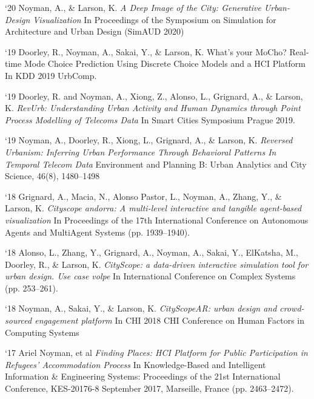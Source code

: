 \begin{tablist}
    \item[`20] \tab  Noyman, A., \& Larson, K.
    \textit{A Deep Image of the City: Generative Urban-Design Visualization
    }
    In Proceedings of the Symposium on Simulation for Architecture and Urban Design (SimAUD 2020)


    \item[`19] \tab  Doorley, R., Noyman, A., Sakai, Y., \& Larson, K.
    What’s your MoCho? Real-time Mode Choice Prediction Using Discrete Choice Models and a HCI Platform
    In KDD 2019 UrbComp.

    \item[`19] \tab  Doorley, R. and Noyman, A., Xiong, Z., Alonso, L., Grignard, A., \& Larson, K.
    \textit{RevUrb: Understanding Urban Activity and Human Dynamics through Point Process Modelling of Telecoms Data}
    In Smart Cities Symposium Prague 2019.

    \item[`19] \tab  Noyman, A., Doorley, R., Xiong, L., Grignard, A., \& Larson, K.
    \textit{Reversed Urbanism: Inferring Urban Performance Through Behavioral Patterns In Temporal Telecom Data}
    Environment and Planning B: Urban Analytics and City Science, 46(8), 1480–1498

    \item[`18] \tab  Grignard, A., Macia, N., Alonso Pastor, L., Noyman, A., Zhang, Y., \& Larson, K.
    \textit{Cityscope andorra: A multi-level interactive and tangible agent-based visualization}
    In Proceedings of the 17th International Conference on Autonomous Agents and MultiAgent Systems (pp. 1939–1940).

    \item[`18] \tab  Alonso, L., Zhang, Y., Grignard, A., Noyman, A., Sakai, Y., ElKatsha, M., Doorley, R., \& Larson, K.
    \textit{CityScope: a data-driven interactive simulation tool for urban design. Use case volpe}
    In International Conference on Complex Systems (pp. 253–261).

    \item[`18] \tab  Noyman, A., Sakai, Y., \& Larson, K.
    \textit{CityScopeAR: urban design and crowd-sourced engagement platform
    }In CHI 2018 CHI Conference on Human Factors in Computing Systems
    \item[`17] \tab  Ariel Noyman, et al
    \textit{Finding Places: HCI Platform for Public Participation in Refugees’ Accommodation Process}
    In Knowledge-Based and Intelligent Information \& Engineering Systems: Proceedings of the 21st International Conference, KES-20176-8 September 2017, Marseille, France (pp. 2463–2472).


\end{tablist}
